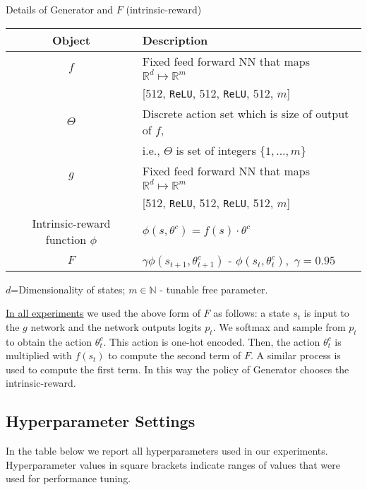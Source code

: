 \documentclass{article}
\begin{document}
Details of {\selectfont Generator} and $F$ (intrinsic-reward)\\
\begin{tabular}{c|l}
\textbf{Object} & \textbf{Description}\\
\hline
$f$ & Fixed feed forward NN that maps $\mathbb{R}^d \mapsto \mathbb{R}^m$ \\
    & [512, \texttt{ReLU}, 512, \texttt{ReLU}, 512, $m$] \\
$\Theta$ & Discrete action set which is size of output of $f$,\\
    & i.e., $\Theta$ is set of integers $\{1,...,m\}$ \\
$g$ & Fixed feed forward NN that maps $\mathbb{R}^d \mapsto \mathbb{R}^m$ \\
    & [512, \texttt{ReLU}, 512, \texttt{ReLU}, 512, $m$] \\
Intrinsic-reward function $\phi$ &  $\phi(s,\theta^c)=f(s)\cdot \theta^c$\\
$F$ & $\gamma \phi(s_{t+1}, \theta^c_{t+1})$ - $\phi(s_{t},\theta^c_{t}),$\;\; $\gamma=0.95$\\
\end{tabular}

$d$=Dimensionality of states; $m\in \mathbb{N}$ - tunable free parameter.

\underline{In all experiments} we used the above form of $F$ as follows: a state $s_t$ is input to the $g$ network and the network outputs logits $p_t$. We softmax and sample from $p_t$ to obtain the action $\theta^c_t$. This action is one-hot encoded. Then, the action $\theta^c_t$ is multiplied with $f(s_t)$ to compute the second term of $F$. A similar process is used to compute the first term. In this way the policy of {\selectfont Generator} chooses the intrinsic-reward.

\subsection{Hyperparameter Settings}
In the table below we report all hyperparameters used in our experiments. Hyperparameter values in square brackets indicate ranges of values that were used for performance tuning.
\end{document}
